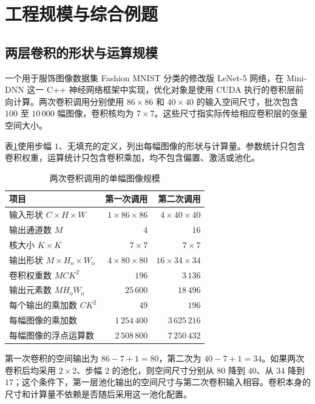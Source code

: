 \section{工程规模与综合例题}
\label{l11:sec:examples}

\subsection{两层卷积的形状与运算规模}
\label{l11:subsec:project_scale}

一个用于服饰图像数据集 Fashion MNIST 分类的修改版 LeNet-5 网络，在 Mini-DNN 这一 C++ 神经网络框架中实现，优化对象是使用 CUDA 执行的卷积层前向计算。两次卷积调用分别使用 $86\times86$ 和 $40\times40$ 的输入空间尺寸，批次包含 $100$ 至 $10\,000$ 幅图像，卷积核均为 $7\times7$。这些尺寸指实际传给相应卷积层的张量空间大小。

表\ref{l11:tab:project_shapes}使用步幅 $1$、无填充的定义，列出每幅图像的形状与计算量。参数统计只包含卷积权重，运算统计只包含卷积乘加，均不包含偏置、激活或池化。

\begin{table}[htbp]
\centering
\small
\caption{两次卷积调用的单幅图像规模}
\label{l11:tab:project_shapes}
\begin{tabularx}{\linewidth}{Xrr}
\toprule
项目 & 第一次调用 & 第二次调用\\
\midrule
输入形状 $C\times H\times W$ & $1\times86\times86$ & $4\times40\times40$\\
输出通道数 $M$ & $4$ & $16$\\
核大小 $K\times K$ & $7\times7$ & $7\times7$\\
输出形状 $M\times H_{\mathrm{o}}\times W_{\mathrm{o}}$ & $4\times80\times80$ & $16\times34\times34$\\
卷积权重数 $MCK^2$ & $196$ & $3\,136$\\
输出元素数 $MH_{\mathrm{o}}W_{\mathrm{o}}$ & $25\,600$ & $18\,496$\\
每个输出的乘加数 $CK^2$ & $49$ & $196$\\
每幅图像的乘加数 & $1\,254\,400$ & $3\,625\,216$\\
每幅图像的浮点运算数 & $2\,508\,800$ & $7\,250\,432$\\
\bottomrule
\end{tabularx}
\end{table}

第一次卷积的空间输出为 $86-7+1=80$，第二次为 $40-7+1=34$。如果两次卷积后均采用 $2\times2$、步幅 $2$ 的池化，则空间尺寸分别从 $80$ 降到 $40$、从 $34$ 降到 $17$；这个条件下，第一层池化输出的空间尺寸与第二次卷积输入相容。卷积本身的尺寸和计算量不依赖是否随后采用这一池化配置。

